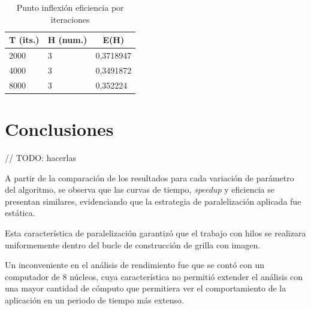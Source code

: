 \documentclass[jou]{apa6}
\begin{document}
\begin{table}[]
\centering
\caption{Punto inflexión eficiencia por iteraciones}
\label{my-label}
\begin{tabular}{@{}lll@{}}
\toprule
\multicolumn{1}{c}{T (its.)} & \multicolumn{1}{c}{H (num.)} & \multicolumn{1}{c}{E(H)} \\ \midrule
2000                         & 3                            & 0,3718947                \\
4000                         & 3                            & 0,3491872                \\
8000                         & 3                            & 0,352224                 \\ \bottomrule
\end{tabular}
\end{table}

\section{Conclusiones}
// TODO: hacerlas

A partir de la comparación de los resultados para cada variación de parámetro del algoritmo, se observa que las curvas de tiempo, \textit{speedup} y eficiencia se presentan similares, evidenciando que la estrategia de paralelización aplicada fue estática. 

Esta característica de paralelización garantizó que el trabajo con hilos se realizara uniformemente dentro del bucle de construcción de grilla con imagen.

Un inconveniente en el análisis de rendimiento fue que se contó con un computador de 8 núcleos, cuya característica no permitió extender el análisis con una mayor cantidad de cómputo que permitiera ver el comportamiento de la aplicación en un periodo de tiempo más extenso.
\end{document}
